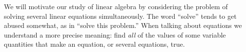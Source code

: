 %
\begin{introduction}
\begin{para}We will motivate our study of linear algebra by considering the problem of solving several linear equations simultaneously.  The word ``solve'' tends to get abused somewhat, as in ``solve this problem.''  When talking about equations we understand a more precise meaning:  find {\em all} of the values of some variable quantities that make an equation, or several equations, true.\end{para}
\end{introduction}
%
